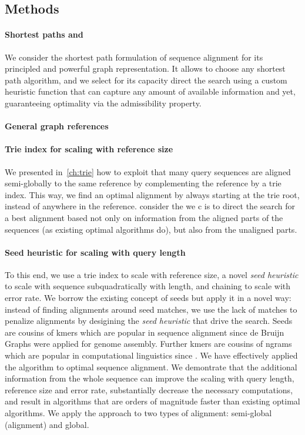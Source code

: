 \subsection*{Methods}

\paragraph{Shortest paths and \A}
We consider the shortest path formulation of sequence alignment for its
principled and powerful graph representation. It allows to choose any shortest
path algorithm, and we select \A for its capacity direct the search using a
custom heuristic function that can capture any amount of available information
and yet, guaranteeing optimality via the admissibility property.

\paragraph{General graph references}

\paragraph{Trie index for scaling with reference size}
We presented in~\cref{ch:trie} how to exploit that many query sequences are
aligned semi-globally to the same reference by complementing the reference by a
trie index. This way, we find an optimal alignment by always starting at the
trie root, instead of anywhere in the reference.
%
consider the we c is to
direct the search for a best alignment based not only on information from the
aligned parts of the sequences (as existing optimal algorithms do), but also
from the unaligned parts. 

\paragraph{Seed heuristic for scaling with query length}
To this end, we use a trie index to scale with reference size, a novel
\emph{seed heuristic} to scale with sequence subquadratically with length, and
chaining to scale with error rate.
%
We borrow the existing concept of seeds but apply it in a novel way: instead of
finding alignments around seed matches, we use the lack of matches to penalize
alignments by desigining the \emph{seed heuristic} that drive the \A search.
Seeds are cousins of kmers which are popular in sequence alignment since de
Bruijn Graphs were applied for genome assembly. Further kmers are cousins of
ngrams which are popular in computational linguistics since .
%
We have effectively applied the \A algorithm to optimal sequence alignment. We
demontrate that the additional information from the whole sequence can improve
the scaling with query length, reference size and error rate, substantially
decrease the necessary computations, and result in algorithms that are orders of
magnitude faster than existing optimal algorithms. We apply the \A approach to
two types of alignment: semi-global (alignment) and global.


